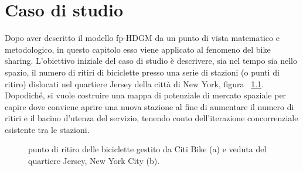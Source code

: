 \chapter[Caso di studio]{Caso di studio}

Dopo aver descritto il modello fp-HDGM da un punto di vista matematico e metodologico, in questo capitolo esso viene applicato al fenomeno del bike sharing. L'obiettivo iniziale del caso di studio è descrivere, sia nel tempo sia nello spazio, il numero di ritiri di biciclette presso una serie di stazioni (o punti di ritiro) dislocati nel quartiere Jersey della città di New York, figura ~\ref{presentazione_Jersey_City}. Dopodiché, si vuole costruire una mappa di potenziale di mercato spaziale per capire dove conviene aprire una nuova stazione al fine di aumentare il numero di ritiri e il bacino d'utenza del servizio, tenendo conto dell'iterazione concorrenziale esistente tra le stazioni.

\begin{figure}[b!]
	\centering
	\quad
	\quad
	\caption[Punto di ritiro delle biciclette e veduta del quartiere Jersey]{punto di ritiro delle biciclette gestito da Citi Bike (a) e veduta del quartiere Jersey, New York City (b).}
	\label{presentazione_Jersey_City}
\end{figure}

